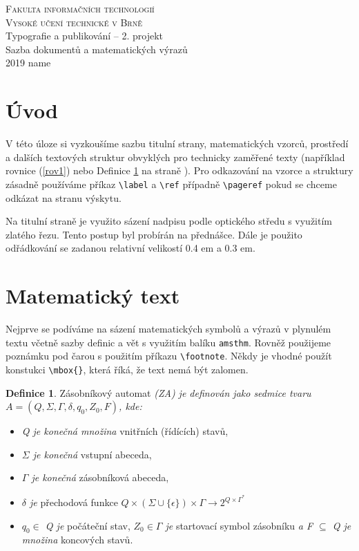 \documentclass[a4paper, 11pt, twocolumn]{article}
\theoremstyle{definition}
\newtheorem{definice}{Definice}
\theoremstyle{definition}
\begin{document}
\begin{titlepage}
    \begin{center}
        \textsc{\Huge Fakulta informačních technologií\\[3.75mm]Vysoké učení technické v Brně}\\
        {\LARGE Typografie a publikování -- 2. projekt\\
        Sazba dokumentů a matematických výrazů\\}
        \Large 2019 \hfill name
    \end{center}
\end{titlepage}
\newpage
\section*{Úvod}

V této úloze si vyzkoušíme sazbu titulní strany, matematických vzorců, prostředí a dalších textových struktur obvyklých pro technicky zaměřené texty (například rovnice (\ref{rov1}) nebo Definice \ref{def1} na straně \pageref{def1}). Pro odkazování na vzorce a struktury zásadně používáme příkaz \verb|\label| a \verb|\ref| případně \verb|\pageref| pokud se chceme odkázat na stranu výskytu.

Na titulní straně je využito sázení nadpisu podle optického středu s využitím zlatého řezu. Tento postup byl probírán na přednášce. Dále je použito odřádkování se zadanou relativní velikostí 0.4 em a 0.3 em.

\section{Matematický text}

Nejprve se podíváme na sázení matematických symbolů a výrazů v plynulém textu včetně sazby definic a vět s využitím balíku \verb|amsthm|. Rovněž použijeme poznámku pod čarou s použitím příkazu \verb|\footnote|. Někdy je vhodné použít konstukci \verb|\mbox{}|, která říká, že text nemá být zalomen.

\begin{definice}
    \label{def1} Zásobníkový automat \emph{(ZA) je definován jako sedmice tvaru $A = (Q, \Sigma, \Gamma, \delta, q_0, Z_0, F)$, kde:}

    \begin{itemize}
        \item \emph{Q je konečná množina} vnitřních (řídících) stavů,
        \item \emph{$\Sigma$ je konečná} vstupní abeceda,
        \item \emph{$\Gamma$ je konečná} zásobníková abeceda,
        \item \emph{$\delta$ je} přechodová funkce $Q \times (\Sigma \cup \{\epsilon\}) \times \Gamma \rightarrow 2^{Q \times \Gamma^*}$
        \item \emph{$q_0 \in$ Q je} počáteční stav, \emph{$Z_0 \in \Gamma$ je} startovací symbol zásobníku \emph{a F $\subseteq$ Q je množina} koncových stavů.
    \end{itemize}
\end{definice}
\end{document}
